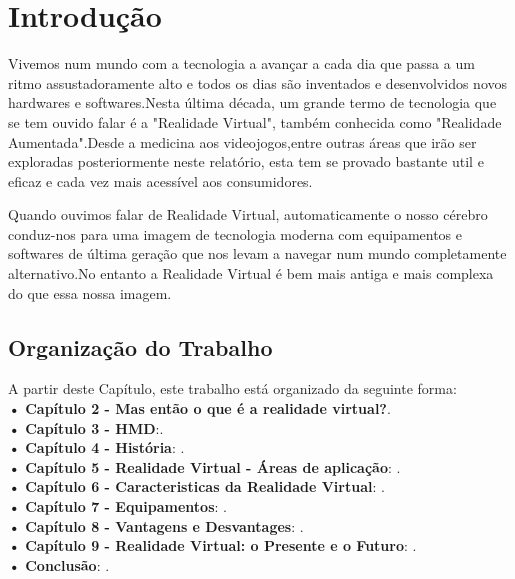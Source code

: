\chapter{Introdução}

Vivemos num mundo com a tecnologia a avançar a cada dia que passa a um ritmo assustadoramente alto e todos os dias são inventados e desenvolvidos novos hardwares e softwares.Nesta última década, um grande termo de tecnologia que se tem ouvido falar é a "Realidade Virtual", também conhecida como "Realidade Aumentada".Desde a medicina aos videojogos,entre outras áreas que irão ser exploradas posteriormente neste relatório, esta tem se provado bastante util e eficaz e cada vez mais acessível aos consumidores.

Quando ouvimos falar de Realidade Virtual, automaticamente o nosso cérebro conduz-nos para uma imagem de tecnologia moderna com equipamentos e softwares de última geração que nos levam a navegar num mundo completamente alternativo.No entanto a Realidade Virtual é bem mais antiga e mais complexa do que essa nossa imagem.\\

\section{Organização do Trabalho}

A partir deste Capítulo, este trabalho está organizado da seguinte forma:\\

\textbf{•  }\textbf{Capítulo 2 - Mas então o que é a realidade virtual?}.\\

\textbf{•  }\textbf{Capítulo 3 - HMD}:.\\

\textbf{•  }\textbf{Capítulo 4 - História}: .\\

\textbf{•  }\textbf{Capítulo 5 - Realidade Virtual - Áreas de aplicação}: .\\

\textbf{•  }\textbf{Capítulo 6 - Caracteristicas da Realidade Virtual}: .\\

\textbf{•  }\textbf{Capítulo 7 - Equipamentos}: .\\

\textbf{•  }\textbf{Capítulo 8 - Vantagens e Desvantages}: .\\

\textbf{•  }\textbf{Capítulo 9 - Realidade Virtual: o Presente e o Futuro}: .\\

\textbf{•  }\textbf{Conclusão}: .\\
	



